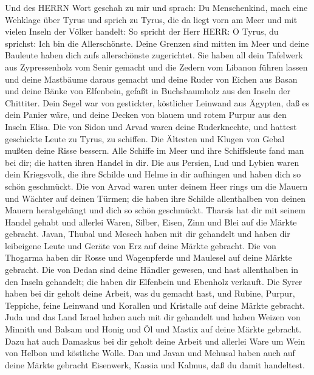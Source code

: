  Und des HERRN Wort geschah zu mir und sprach: 
Du Menschenkind, mach eine Wehklage über Tyrus  und sprich
zu Tyrus, die da liegt vorn am Meer und mit vielen Inseln der Völker
handelt: So spricht der Herr HERR: O Tyrus, du sprichst: Ich bin die
Allerschönste.  Deine Grenzen sind mitten im Meer und deine
Bauleute haben dich aufs allerschönste zugerichtet.  Sie
haben all dein Tafelwerk aus Zypressenholz vom Senir gemacht und die
Zedern vom Libanon führen lassen und deine Mastbäume daraus gemacht
 und deine Ruder von Eichen aus Basan und deine Bänke von
Elfenbein, gefaßt in Buchsbaumholz aus den Inseln der Chittiter.
 Dein Segel war von gestickter, köstlicher Leinwand aus
Ägypten, daß es dein Panier wäre, und deine Decken von blauem und rotem
Purpur aus den Inseln Elisa.  Die von Sidon und Arvad waren
deine Ruderknechte, und hattest geschickte Leute zu Tyrus, zu schiffen.
 Die Ältesten und Klugen von Gebal mußten deine Risse
bessern. Alle Schiffe im Meer und ihre Schiffsleute fand man bei dir;
die hatten ihren Handel in dir.  Die aus Persien, Lud und
Lybien waren dein Kriegsvolk, die ihre Schilde und Helme in dir
aufhingen und haben dich so schön geschmückt.  Die von
Arvad waren unter deinem Heer rings um die Mauern und Wächter auf deinen
Türmen; die haben ihre Schilde allenthalben von deinen Mauern
herabgehängt und dich so schön geschmückt.  Tharsis hat dir
mit seinem Handel gehabt und allerlei Waren, Silber, Eisen, Zinn und
Blei auf die Märkte gebracht.  Javan, Thubal und Mesech
haben mit dir gehandelt und haben dir leibeigene Leute und Geräte von
Erz auf deine Märkte gebracht.  Die von Thogarma haben dir
Rosse und Wagenpferde und Maulesel auf deine Märkte gebracht.
 Die von Dedan sind deine Händler gewesen, und hast
allenthalben in den Inseln gehandelt; die haben dir Elfenbein und
Ebenholz verkauft.  Die Syrer haben bei dir geholt deine
Arbeit, was du gemacht hast, und Rubine, Purpur, Teppiche, feine
Leinwand und Korallen und Kristalle auf deine Märkte gebracht.
 Juda und das Land Israel haben auch mit dir gehandelt und
haben Weizen von Minnith und Balsam und Honig und Öl und Mastix auf
deine Märkte gebracht.  Dazu hat auch Damaskus bei dir
geholt deine Arbeit und allerlei Ware um Wein von Helbon und köstliche
Wolle.  Dan und Javan und Mehusal haben auch auf deine
Märkte gebracht Eisenwerk, Kassia und Kalmus, daß du damit handeltest.
